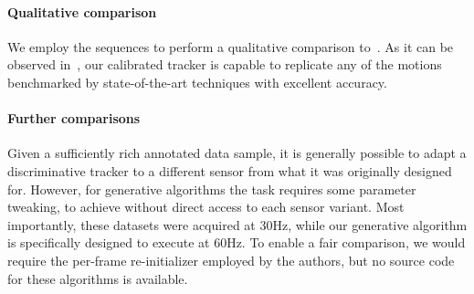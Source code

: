 \paragraph{Qualitative comparison}
We employ the \handy{} sequences to perform a qualitative comparison to~\cite{qian2014realtime,sridhar2015fast,sharp2015accurate,taylor2016concerto}. As it can be observed in~\VideoExtra{}, our calibrated tracker is capable to replicate any of the motions benchmarked by state-of-the-art techniques with excellent accuracy.

\paragraph{Further comparisons}
Given a sufficiently rich annotated data sample, it is generally possible to adapt a discriminative tracker to a different sensor from what it was originally designed for. However, for generative algorithms the task requires some parameter tweaking,  to achieve without direct access to each sensor variant. 
Most importantly, these datasets were acquired at 30Hz, while our generative algorithm is specifically designed to execute at 60Hz. To enable a fair comparison, we would require the  per-frame re-initializer employed by the authors, but no source code for these algorithms is available.

